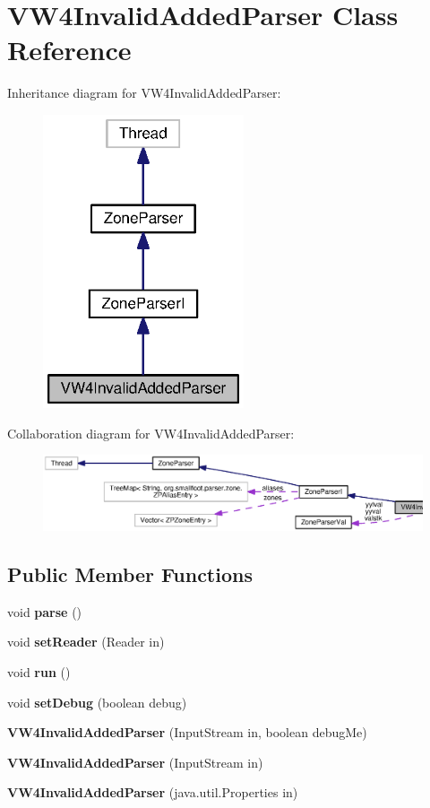 \section{V\+W4\+Invalid\+Added\+Parser Class Reference}
\label{classorg_1_1smallfoot_1_1parser_1_1zone_1_1VW4InvalidAddedParser}


Inheritance diagram for V\+W4\+Invalid\+Added\+Parser\+:\nopagebreak
\begin{figure}[H]
\begin{center}
\leavevmode
\includegraphics[width=168pt]{classorg_1_1smallfoot_1_1parser_1_1zone_1_1VW4InvalidAddedParser__inherit__graph}
\end{center}
\end{figure}


Collaboration diagram for V\+W4\+Invalid\+Added\+Parser\+:\nopagebreak
\begin{figure}[H]
\begin{center}
\leavevmode
\includegraphics[width=350pt]{classorg_1_1smallfoot_1_1parser_1_1zone_1_1VW4InvalidAddedParser__coll__graph}
\end{center}
\end{figure}
\subsection*{Public Member Functions}
\begin{DoxyCompactItemize}
\item 
void {\bf parse} ()
\item 
void {\bf set\+Reader} (Reader in)
\item 
void {\bf run} ()
\item 
void {\bf set\+Debug} (boolean debug)
\item 
{\bf V\+W4\+Invalid\+Added\+Parser} (Input\+Stream in, boolean debug\+Me)
\item 
{\bf V\+W4\+Invalid\+Added\+Parser} (Input\+Stream in)
\item 
{\bf V\+W4\+Invalid\+Added\+Parser} (java.\+util.\+Properties in)
\end{DoxyCompactItemize}
